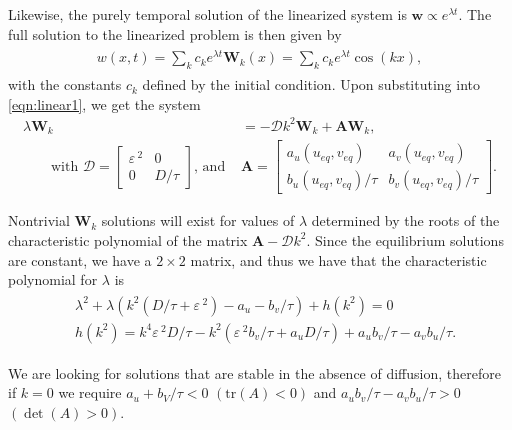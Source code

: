 \documentclass[a4paper,10pt]{article}
\newcommand{\lA}{\ensuremath{\lambda}}
\newcommand{\Ep}{\ensuremath{\varepsilon\,}}
\newcommand{\ww}{\ensuremath{\mathbf{w}}}
\newcommand{\WW}{\ensuremath{\mathbf{W}}}
\newcommand{\DD}{\ensuremath{\mathcal{D}}}
\newcommand{\Aa}{\ensuremath{\mathbf{A}}}
\begin{document}
Likewise, the purely temporal solution of the linearized system is $\ww\propto e^{\lA t}$. The full solution to the linearized problem is then given by
% 
\begin{equation}
\label{eqn:full_soln_lin}
\begin{split}
\begin{aligned}
	w(x,t) = \sum_kc_ke^{\lA t}\WW_k(x) = \sum_kc_ke^{\lA t}\cos(kx),
\end{aligned}
\end{split}
\end{equation}
% 
with the constants $c_k$ defined by the initial condition. Upon substituting into \eqref{eqn:linear1}, we get the system
% 
\begin{equation}
\label{eqn:matrix_lin}
\begin{aligned}
	\lA \WW_k &= -\DD k^2\WW_k + \Aa\WW_k,\\ \qquad \textrm{with }
  \DD =\begin{bmatrix}
		\Ep^2 & 0 \\
		0 & D/\tau
  \end{bmatrix} \textrm{, and }
  &\Aa =
	\begin{bmatrix}
		a_u(u_{eq},v_{eq})& a_v(u_{eq},v_{eq}) \\
		b_u(u_{eq},v_{eq})/\tau& b_v(u_{eq},v_{eq})/\tau
  \end{bmatrix}.
\end{aligned}
\end{equation}

Nontrivial $\WW_k$ solutions will exist for values of $\lA$ determined by the roots of the characteristic polynomial of the matrix $\Aa - \DD k^2$. Since the equilibrium solutions are constant, we have a $2\times 2$ matrix, and thus we have that the characteristic polynomial for $\lA$ is
% 
\begin{equation}
\label{eqn:charac_poly}
\begin{split}
\begin{aligned}
  &\lA^2 + \lA(k^2(D/\tau + \Ep^2) - a_u - b_v/\tau) + h(k^2) = 0 \\
  &h(k^2) = k^4\Ep^2D/\tau - k^2(\Ep^2b_v/\tau + a_uD/\tau) + a_ub_v/\tau - a_vb_u/\tau.
\end{aligned}
\end{split}
\end{equation}

We are looking for solutions that are stable in the absence of diffusion, therefore if $k=0$ we require $a_u+b_V/\tau<0$ $(\textrm{tr}(A)<0)$ and $a_ub_v/\tau - a_vb_u/\tau>0$ $(\det(A)>0)$.
\end{document}
